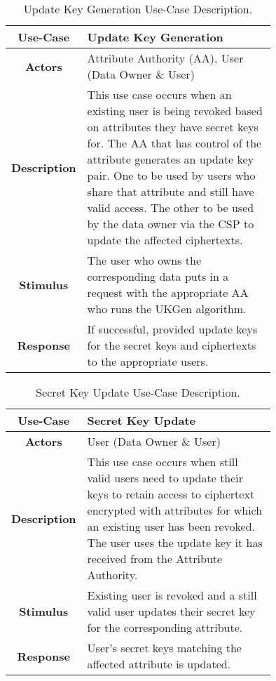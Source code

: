 \begin{table}[]
	\centering
	\begin{tabular}{|c|p{0.75\linewidth}|}
		\hline
		\textbf{Use-Case}    & Update Key Generation                                   \\ \hline
		\textbf{Actors}      & Attribute Authority (AA), User (Data Owner \& User)                        \\ \hline
		\textbf{Description} & This use case occurs when an existing user is being revoked based on attributes they have secret keys for. The AA that has control of the attribute generates an update key pair. One to be used by users who share that attribute and still have valid access. The other to be used by the data owner via the CSP to update the affected ciphertexts. \\ \hline
		\textbf{Stimulus}    & The user who owns the corresponding data puts in a request with the appropriate AA who runs the UKGen algorithm.                   \\ \hline
		\textbf{Response}    & If successful, provided update keys for the secret keys and ciphertexts to the appropriate users.             \\ \hline
	\end{tabular}
	\caption{Update Key Generation Use-Case Description.}
	\label{tab:use_case_ukeygen}
\end{table}

\begin{table}[]
	\centering
	\begin{tabular}{|c|p{0.75\linewidth}|}
		\hline
		\textbf{Use-Case}    & Secret Key Update                                  \\ \hline
		\textbf{Actors}      & User (Data Owner \& User)                        \\ \hline
		\textbf{Description} & This use case occurs when still valid users need to update their keys to retain access to ciphertext encrypted with attributes for which an existing user has been revoked. The user uses the update key it has received from the Attribute Authority. \\ \hline
		\textbf{Stimulus}    & Existing user is revoked and a still valid user updates their secret key for the corresponding attribute.                     \\ \hline
		\textbf{Response}    & User's secret keys matching the affected attribute is updated.             \\ \hline
	\end{tabular}
	\caption{Secret Key Update Use-Case Description.}
	\label{tab:use_case_skupd}
\end{table}

